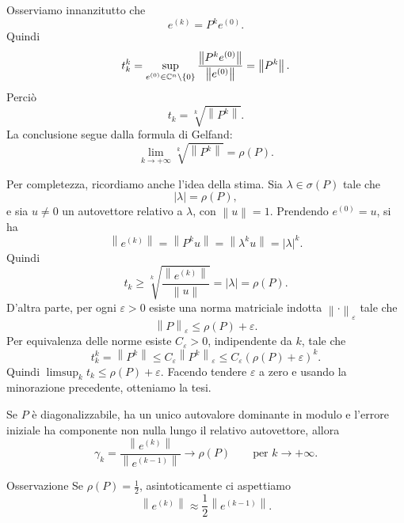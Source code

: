 \documentclass[a4paper]{article}
\newcommand{\norm}[1]{\left\lVert#1\right\rVert}
\begin{document}
\begin{snippetproof}{}
    Osserviamo innanzitutto che
    \[
        e^{(k)}=P^k e^{(0)}.
    \]
    Quindi
    \[
        t_k^k
        =
        \sup_{e^{(0)}\in\complexnumbers^n\setminus\{0\}}
        \frac{\norm{P^k e^{(0)}}}{\norm{e^{(0)}}}
        =
        \norm{P^k}.
    \]
    Perciò
    \[
        t_k=\sqrt[k]{\norm{P^k}}.
    \]
    La conclusione segue dalla formula di Gelfand:
    \[
        \lim_{k\to+\infty}\sqrt[k]{\norm{P^k}}=\rho(P).
    \]

    Per completezza, ricordiamo anche l'idea della stima. Sia \(\lambda\in\sigma(P)\) tale che
    \[
        |\lambda|=\rho(P),
    \]
    e sia \(u\neq 0\) un autovettore relativo a \(\lambda\), con \(\norm{u}=1\). Prendendo
    \(e^{(0)}=u\), si ha
    \[
        \norm{e^{(k)}}
        =
        \norm{P^k u}
        =
        \norm{\lambda^k u}
        =
        {|\lambda|}^k.
    \]
    Quindi
    \[
        t_k
        \geq
        \sqrt[k]{\frac{\norm{e^{(k)}}}{\norm{u}}}
        =
        |\lambda|
        =
        \rho(P).
    \]
    D'altra parte, per ogni \(\varepsilon>0\) esiste una norma matriciale indotta \(\norm{\cdot}_\varepsilon\) tale che
    \[
        \norm{P}_\varepsilon\leq\rho(P)+\varepsilon.
    \]
    Per equivalenza delle norme esiste \(C_\varepsilon>0\), indipendente da \(k\), tale che
    \[
        t_k^k=\norm{P^k}\leq C_\varepsilon\norm{P^k}_\varepsilon
        \leq C_\varepsilon(\rho(P)+\varepsilon)^k.
    \]
    Quindi \(\limsup_k t_k\leq\rho(P)+\varepsilon\). Facendo tendere \(\varepsilon\) a zero e usando la minorazione precedente, otteniamo la tesi.

\end{snippetproof}

\begin{snippettheorem}{}
    Se \(P\) è diagonalizzabile, ha un unico autovalore dominante in modulo e l'errore iniziale ha componente non nulla lungo il relativo autovettore, allora
    \[
        \gamma_k
        =
        \frac{\norm{e^{(k)}}}{\norm{e^{(k-1)}}}
        \to
        \rho(P)
        \qquad
        \text{per } k\to+\infty.
    \]
\end{snippettheorem}

\begin{snippetproposition}{Osservazione}
    Se \(\rho(P)=\frac{1}{2}\), asintoticamente ci aspettiamo
    \[
        \norm{e^{(k)}}
        \approx
        \frac{1}{2}\norm{e^{(k-1)}}.
    \]
\end{snippetproposition}
\end{document}
